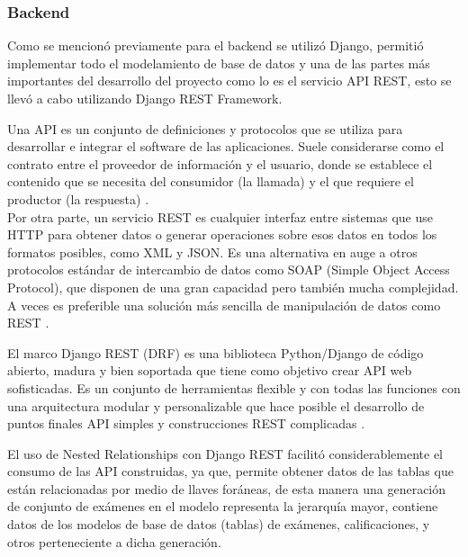 \documentclass[../Main.tex]{subfiles}
\begin{document}
    \subsubsection{Backend}
    \begin{justify}
    Como se mencionó previamente para el backend se utilizó Django, permitió implementar todo el modelamiento de base de datos y una de las partes más importantes del desarrollo del proyecto como lo es el servicio API REST, esto se llevó a cabo utilizando Django REST Framework.
    
    Una API es un conjunto de definiciones y protocolos que se utiliza para desarrollar e integrar el software de las aplicaciones. Suele considerarse como el contrato entre el proveedor de información y el usuario, donde se establece el contenido que se necesita del consumidor (la llamada) y el que requiere el productor (la respuesta) \cite{55}.\\ %
    Por otra parte, un servicio REST es cualquier interfaz entre sistemas que use HTTP para obtener datos o generar operaciones sobre esos datos en todos los formatos posibles, como XML y JSON. Es una alternativa en auge a otros protocolos estándar de intercambio de datos como SOAP (Simple Object Access Protocol), que disponen de una gran capacidad pero también mucha complejidad. A veces es preferible una solución más sencilla de manipulación de datos como REST \cite{56}. %
    
    \end{justify}
    \begin{justify}
    El marco Django REST (DRF) es una biblioteca Python/Django de código abierto, madura y bien soportada que tiene como objetivo crear API web sofisticadas. Es un conjunto de herramientas flexible y con todas las funciones con una arquitectura modular y personalizable que hace posible el desarrollo de puntos finales API simples y construcciones REST complicadas \cite{57}.
    \end{justify}
    
    \begin{justify}
    El uso de Nested Relationships con Django REST facilitó considerablemente el consumo de las API construidas, ya que, permite obtener datos de las tablas que están relacionadas por medio de llaves foráneas, de esta manera una generación de conjunto de exámenes en el modelo representa la jerarquía mayor, contiene datos de los modelos de base de datos (tablas) de exámenes, calificaciones, y otros perteneciente a dicha generación.
    \end{justify}
    
\end{document}
